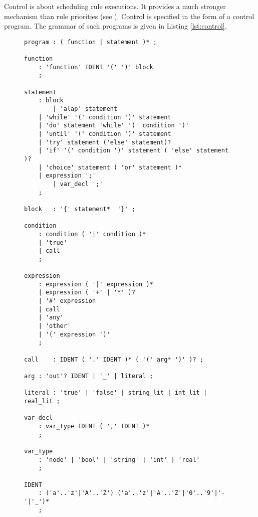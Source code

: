 Control is about scheduling rule executions. It provides a much stronger
mechanism than rule priorities (see ).  Control is
specified in the form of a control program. The grammar of such programs is
given in Listing \ref{lst:control}.

\lstset{
	basicstyle=\ttfamily\scriptsize
}

\begin{figure}
\begin{lstlisting}[label=lst:control,caption={Grammar of Control Programs}]
program	: ( function | statement )* ;

function
	: 'function' IDENT '(' ')' block
	;

statement 
	: block
        | 'alap' statement
	| 'while' '(' condition ')' statement
	| 'do' statement 'while' '(' condition ')'
	| 'until' '(' condition ')' statement
	| 'try' statement ('else' statement)?
	| 'if' '(' condition ')' statement ( 'else' statement )?
	| 'choice' statement ( 'or' statement )*
	| expression ';'
        | var_decl ';'
	;

block	: '{' statement*  '}' ;

condition
	: condition ( '|' condition )*
	| 'true' 
	| call 
	;

expression	
	: expression ( '|' expression )*
	| expression ( '+' | '*' )?
	| '#' expression
	| call
	| 'any'
	| 'other'
	| '(' expression ')'
	; 

call	: IDENT ( '.' IDENT )* ( '(' arg* ')' )? ;

arg	: 'out'? IDENT | '_' | literal ;

literal	: 'true' | 'false' | string_lit | int_lit | real_lit ;

var_decl
	: var_type IDENT ( ',' IDENT )*
	;

var_type
	: 'node' | 'bool' | 'string' | 'int' | 'real'
	;

IDENT
	: ('a'..'z'|'A'..'Z') ('a'..'z'|'A'..'Z'|'0'..'9'|'-'|'_')*
	;
\end{lstlisting}
\end{figure}

